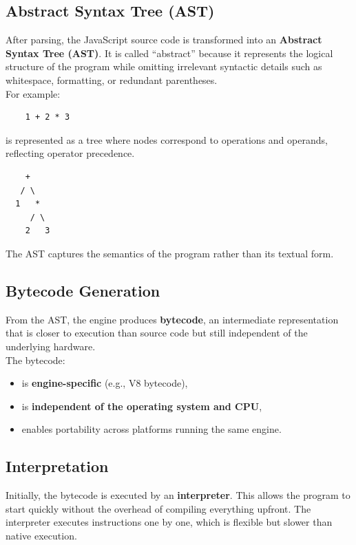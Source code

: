 \documentclass{scrbook}
\begin{document}
\subsection{Abstract Syntax Tree (AST)}

After parsing, the JavaScript source code is transformed into an \textbf{Abstract Syntax Tree (AST)}. It is called ``abstract'' because it represents the logical structure of the program while omitting irrelevant syntactic details such as whitespace, formatting, or redundant parentheses.\\

For example:

\begin{lstlisting}
    1 + 2 * 3
\end{lstlisting}

is represented as a tree where nodes correspond to operations and operands, reflecting operator precedence.

\begin{lstlisting}
    +
   / \
  1   *
     / \
    2   3
\end{lstlisting}

The AST captures the semantics of the program rather than its textual form.

\subsection{Bytecode Generation}

From the AST, the engine produces \textbf{bytecode}, an intermediate representation that is closer to execution than source code but still independent of the underlying hardware.\\

The bytecode:
\begin{itemize}
    \item is \textbf{engine-specific} (e.g., V8 bytecode),
    \item is \textbf{independent of the operating system and CPU},
    \item enables portability across platforms running the same engine.
\end{itemize}

\subsection{Interpretation}

Initially, the bytecode is executed by an \textbf{interpreter}. This allows the program to start quickly without the overhead of compiling everything upfront. The interpreter executes instructions one by one, which is flexible but slower than native execution.
\end{document}
